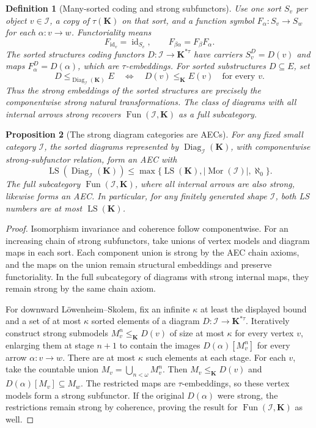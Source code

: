 \documentclass[11pt]{article}
\newcommand{\K}{\mathbf K}
\newcommand{\LS}{\operatorname{LS}}
\theoremstyle{plain}
\newtheorem{definition}{Definition}[section]
\newtheorem{proposition}[definition]{Proposition}
\begin{document}
\begin{definition}[Many-sorted coding and strong subfunctors]
\label{def:functor-sorted-language}
Use one sort $S_v$ per object
$v\in\mathcal I$, a copy of $\tau(\K)$
on that sort, and a function symbol
$F_\alpha:S_v\to S_w$ for each
$\alpha:v\to w$. Functoriality means
\[
F_{\operatorname{id}_v}=\operatorname{id}_{S_v},
\qquad F_{\beta\alpha}=F_\beta F_\alpha.
\]
The sorted structures coding functors
$D:\mathcal I\to\K^{*\tau}$
have carriers $S_v^D=D(v)$ and maps
$F_\alpha^D=D(\alpha)$, which are
$\tau$-embeddings. For sorted
substructures $D\subseteq E$, set
\[
D\leq_{\operatorname{Diag}_{\mathcal I}(\K)}E
\quad\Longleftrightarrow\quad
D(v)\leq_\K E(v)\quad\text{for every }v.
\]
Thus the strong embeddings of the
sorted structures are precisely the
\emph{componentwise strong} natural
transformations. The class of diagrams
with all internal arrows strong
recovers $\operatorname{Fun}(\mathcal I,\K)$
as a full subcategory.
\end{definition}

\begin{proposition}[The strong diagram categories are AECs]
\label{prop:functor-aec}
For any fixed small category $\mathcal I$,
the sorted diagrams represented by
$\operatorname{Diag}_{\mathcal I}(\K)$,
with componentwise strong-subfunctor
relation, form an AEC with
\[
\LS(\operatorname{Diag}_{\mathcal I}(\K))
\leq
\max\{\LS(\K),|\operatorname{Mor}(\mathcal I)|,
\aleph_0\}.
\]
The full subcategory
$\operatorname{Fun}(\mathcal I,\K)$,
where all \emph{internal} arrows are
also strong, likewise forms an AEC.
In particular, for any finitely generated
shape $\mathcal I$, both LS numbers
are at most $\LS(\K)$.
\end{proposition}
\begin{proof}
Isomorphism invariance and coherence
follow componentwise. For an increasing
chain of strong subfunctors, take unions
of vertex models and diagram maps in
each sort. Each component union is
strong by the AEC chain axioms, and
the maps on the union remain structural
embeddings and preserve functoriality.
In the full subcategory of diagrams
with strong internal maps, they remain
strong by the same chain axiom.

For downward L\"owenheim--Skolem,
fix an infinite $\kappa$ at least the
displayed bound and a set of at most
$\kappa$ sorted elements of a diagram
$D:\mathcal I\to\K^{*\tau}$.
Iteratively construct strong submodels
$M_v^n\leq_\K D(v)$ of size at most
$\kappa$ for every vertex $v$,
enlarging them at stage $n+1$ to
contain the images $D(\alpha)[M_v^n]$
for every arrow $\alpha:v\to w$.
There are at most $\kappa$ such
elements at each stage. For each
$v$, take the countable union
$M_v=\bigcup_{n<\omega}M_v^n$.
Then $M_v\leq_\K D(v)$ and
$D(\alpha)[M_v]\subseteq M_w$.
The restricted maps are
$\tau$-embeddings, so these vertex
models form a strong subfunctor.
If the original $D(\alpha)$ were
strong, the restrictions remain
strong by coherence, proving
the result for $\operatorname{Fun}(\mathcal I,\K)$
as well.
\end{proof}
\end{document}
